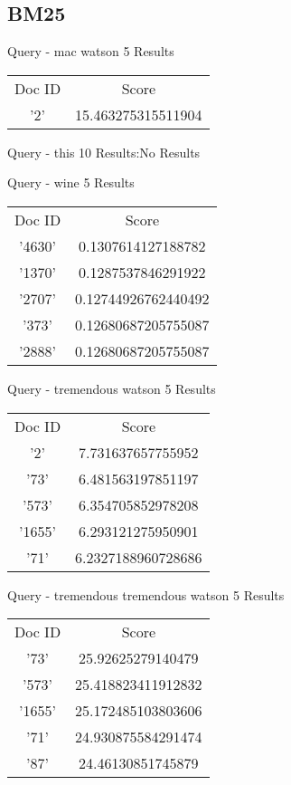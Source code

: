 \documentclass[12pt, letterpaper]{article}
\begin{document}
\begin{center}

\subsection{BM25}
Query -  mac watson 5\newline
Results \newline\newline
\begin{tabular}{c|c}
	Doc ID & Score \\
	'2'& 15.463275315511904 \\
\end{tabular}

Query -  this 10\newline
Results:\newline\newline No Results

Query -  wine 5\newline
Results\newline\newline
\begin{tabular}{c|c}
	Doc ID & Score \\
	'4630'& 0.1307614127188782 \\
	'1370'& 0.1287537846291922 \\
	'2707'& 0.12744926762440492 \\
	'373'& 0.12680687205755087 \\
	'2888'& 0.12680687205755087 \\
\end{tabular}

Query -  tremendous watson 5\newline
Results 	\newline\newline
\begin{tabular}{c|c}
	Doc ID & Score \\
	'2'& 7.731637657755952 \\
	'73'& 6.481563197851197 \\
	'573'& 6.354705852978208 \\
	'1655'& 6.293121275950901 \\
	'71'& 6.2327188960728686 \\
\end{tabular}

Query -  tremendous tremendous watson 5\newline
Results\newline\newline
\begin{tabular}{c|c}
	Doc ID & Score \\
	'73'& 25.92625279140479 \\
	'573'& 25.418823411912832 \\
	'1655'& 25.172485103803606 \\
	'71'& 24.930875584291474 \\
	'87'& 24.46130851745879 \\
\end{tabular}
\end{center}
\end{document}
